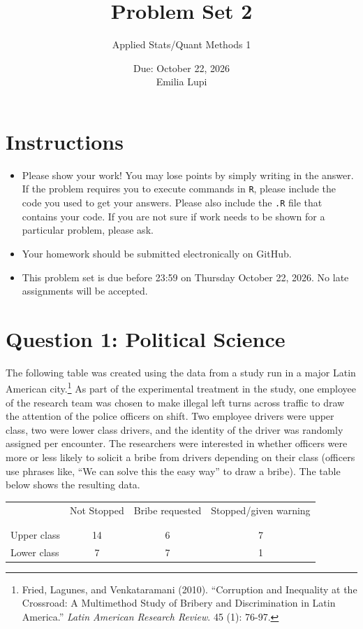 \documentclass[12pt,letterpaper]{article}
\title{Problem Set 2}
\date{Due: October 22, 2026\\[0.5em]Emilia Lupi}
\author{Applied Stats/Quant Methods 1}
\begin{document}
	\maketitle
	\section*{Instructions}
	\begin{itemize}
		\item Please show your work! You may lose points by simply writing in the answer. If the problem requires you to execute commands in \texttt{R}, please include the code you used to get your answers. Please also include the \texttt{.R} file that contains your code. If you are not sure if work needs to be shown for a particular problem, please ask.
		\item Your homework should be submitted electronically on GitHub.
		\item This problem set is due before 23:59 on Thursday October 22, 2026. No late assignments will be accepted.
		
	\end{itemize}
	
	
	\vspace{.5cm}
	\section*{Question 1: Political Science}
	\vspace{.25cm}
	The following table was created using the data from a study run in a major Latin American city.\footnote{Fried, Lagunes, and Venkataramani (2010). ``Corruption and Inequality at the Crossroad: A Multimethod Study of Bribery and Discrimination in Latin America.'' \textit{Latin American Research Review}. 45 (1): 76-97.} As part of the experimental treatment in the study, one employee of the research team was chosen to make illegal left turns across traffic to draw the attention of the police officers on shift. Two employee drivers were upper class, two were lower class drivers, and the identity of the driver was randomly assigned per encounter. The researchers were interested in whether officers were more or less likely to solicit a bribe from drivers depending on their class (officers use phrases like, ``We can solve this the easy way'' to draw a bribe). The table below shows the resulting data.
	
	\newpage
	\begin{table}[H]
		\centering
		\begin{tabular}{l | c c c }
			& Not Stopped & Bribe requested & Stopped/given warning \\
			\\[-1.8ex] 
			\hline \\[-1.8ex]
			Upper class & 14 & 6 & 7 \\
			Lower class & 7 & 7 & 1 \\
			\hline
		\end{tabular}
	\end{table}
	
\end{document}
